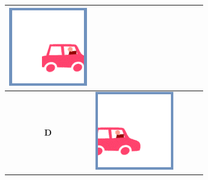 \documentclass[12pt, a4paper]{article}
\begin{document}
\begin{minipage}{\textwidth}
\begin{table}[H]
\begin{tabulary}{\linewidth}{|C|CCCC|}
				\vspace{0.01cm}\includegraphics[width=\linewidth]{option4}
				\\ \hline
				\textbf{D} &
				\vspace{0.01cm}\includegraphics[width=\linewidth]{option1} &

\end{tabulary}
\end{table}
\end{minipage}
\end{document}
